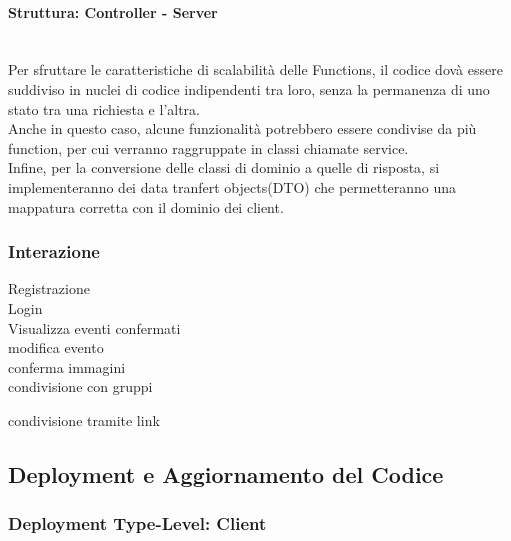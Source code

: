 \paragraph{Struttura: Controller - Server}\mbox{}\\
Per sfruttare le caratteristiche di scalabilità delle Functions, il codice dovà essere suddiviso in nuclei di codice indipendenti tra loro, senza la permanenza di uno stato tra una richiesta e l'altra.\\
Anche in questo caso, alcune funzionalità potrebbero essere condivise da più function, per cui verranno raggruppate in classi chiamate service.\\
Infine, per la conversione delle classi di dominio a quelle di risposta, si implementeranno dei data tranfert objects(DTO) che permetteranno una mappatura corretta con il dominio dei client.\\







\subsubsection{Interazione}

Registrazione\\

Login\\

Visualizza eventi confermati\\

modifica evento\\

conferma immagini\\

condivisione con gruppi

condivisione tramite link\\









\subsection{Deployment e Aggiornamento del Codice}

\subsubsection{Deployment Type-Level: Client}

